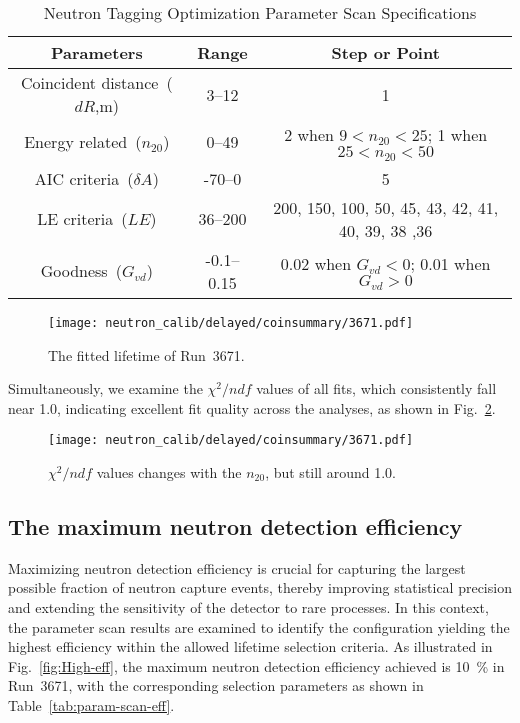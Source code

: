 \begin{table}[htbp]
	\caption{Neutron Tagging Optimization Parameter Scan Specifications}%
	\label{tab:param-scan}
	\centering%
	\begin{tabular}{ccc}
		\toprule%
		Parameters                   & Range      & Step or Point                                     \\
		\midrule%
		Coincident distance~($dR$,m) & 3--12      & 1                                                 \\
		Energy related~($n_{20}$)    & 0--49      & 2 when $9<n_{20}<25$; 1 when $25<n_{20}<50$       \\
		AIC criteria~($\delta A$)    & -70--0     & 5                                                 \\
		LE criteria~($LE$)           & 36--200    & 200, 150, 100, 50, 45, 43, 42, 41, 40, 39, 38 ,36 \\
		Goodness~($G_{vd}$)          & -0.1--0.15 & 0.02 when $G_{vd}<0$; 0.01 when $G_{vd}>0$        \\
		\bottomrule
	\end{tabular}
\end{table}
\begin{figure}[h]
	\centering
	\texttt{[image: neutron\_calib/delayed/coinsummary/3671.pdf]}
	\caption{The fitted lifetime of Run~3671.}
	\label{fig:lifetime3671}
\end{figure}
Simultaneously, we examine the $\chi^2/ndf$ values of all fits, which consistently fall near 1.0, indicating excellent fit quality across the analyses, as shown in Fig.~\ref{fig:chi2}.
\begin{figure}[H]
	\centering
	\texttt{[image: neutron\_calib/delayed/coinsummary/3671.pdf]}
	\caption{$\chi^2/ndf$ values changes with the $n_{20}$, but still around 1.0.}
	\label{fig:chi2}
\end{figure}

\subsection{The maximum neutron detection efficiency}
Maximizing neutron detection efficiency is crucial for capturing the largest possible fraction of neutron capture events, thereby improving statistical precision and extending the sensitivity of the detector to rare processes. In this context, the parameter scan results are examined to identify the configuration yielding the highest efficiency within the allowed lifetime selection criteria. As illustrated in Fig.~\ref{fig:High-eff}, the maximum neutron detection efficiency achieved is \SI{10}{\%} in Run~3671, with the corresponding selection parameters as shown in Table~\ref{tab:param-scan-eff}.

